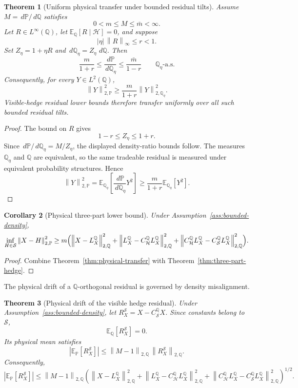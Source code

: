 \documentclass[11pt,a4paper]{amsart}
\theoremstyle{plain}
\newtheorem{theorem}{Theorem}[section]
\newtheorem{corollary}[theorem]{Corollary}
\theoremstyle{definition}
\theoremstyle{remark}
\newcommand{\PP}{\mathbb{P}}
\newcommand{\QQ}{\mathbb{Q}}
\newcommand{\EE}{\mathbb{E}}
\newcommand{\cH}{\mathcal{H}}
\newcommand{\cS}{\mathcal{S}}
\newcommand{\dd}{\,d}
\newcommand{\norm}[1]{\left\lVert #1\right\rVert}
\begin{document}
\begin{theorem}[Uniform physical transfer under bounded residual tilts]\label{thm:uniform-physical-transfer}
Assume \(M=\dd\PP/\dd\QQ\) satisfies
\[
        0<m\le M\le\bar m<\infty.
\]
Let \(R\in L^\infty(\QQ)\), let \(\EE_\QQ[R\mid\cH]=0\), and suppose
\[
        |\eta|\,\norm{R}_\infty\le r<1.
\]
Set \(Z_\eta=1+\eta R\) and \(\dd\QQ_\eta=Z_\eta\,\dd\QQ\).  Then
\[
        \frac{m}{1+r}
        \le
        \frac{\dd\PP}{\dd\QQ_\eta}
        \le
        \frac{\bar m}{1-r}
        \qquad \QQ_\eta\text{-a.s.}
\]
Consequently, for every \(Y\in L^2(\QQ)\),
\[
        \norm{Y}_{2,\PP}^{2}
        \ge
        \frac{m}{1+r}\norm{Y}_{2,\QQ_\eta}^{2}.
\]
Visible-hedge residual lower bounds therefore transfer uniformly over all such bounded residual
tilts.
\end{theorem}

\begin{proof}
The bound on \(R\) gives
\[
        1-r\le Z_\eta\le1+r.
\]
Since \(\dd\PP/\dd\QQ_\eta=M/Z_\eta\), the displayed density-ratio bounds follow.  The measures
\(\QQ_\eta\) and \(\QQ\) are equivalent, so the same tradeable residual is measured under equivalent
probability structures.  Hence
\[
        \norm{Y}_{2,\PP}^{2}
        =
        \EE_{\QQ_\eta}\!\left[\frac{\dd\PP}{\dd\QQ_\eta}Y^2\right]
        \ge
        \frac{m}{1+r}\EE_{\QQ_\eta}[Y^2].
\]
\end{proof}

\begin{corollary}[Physical three-part lower bound]\label{cor:physical-three-part}
Under Assumption~\ref{ass:bounded-density},
\[
        \inf_{H\in\cS}\norm{X-H}_{2,\PP}^2
        \ge
        m\Bigl(
        \norm{X-L_X^\QQ}_{2,\QQ}^2
        +
        \norm{L_X^\QQ-C_{\cH}^{\QQ}L_X^\QQ}_{2,\QQ}^2
        +
        \norm{C_{\cH}^{\QQ}L_X^\QQ-C_{\cS}^{\QQ}L_X^\QQ}_{2,\QQ}^2
        \Bigr).
\]
\end{corollary}

\begin{proof}
Combine Theorem~\ref{thm:physical-transfer} with Theorem~\ref{thm:three-part-hedge}.
\end{proof}

The physical drift of a \(\QQ\)-orthogonal residual is governed by density misalignment.

\begin{theorem}[Physical drift of the visible hedge residual]\label{thm:physical-residual-drift}
Under Assumption~\ref{ass:bounded-density}, let \(R_X^{\cS}=X-C_{\cS}^{\QQ}X\).  Since constants
belong to \(\cS\),
\[
        \EE_\QQ[R_X^{\cS}]=0.
\]
Its physical mean satisfies
\[
        |\EE_\PP[R_X^{\cS}]|
        \le
        \norm{M-1}_{2,\QQ}\,
        \norm{R_X^{\cS}}_{2,\QQ}.
\]
Consequently,
\[
        |\EE_\PP[R_X^{\cS}]|
        \le
        \norm{M-1}_{2,\QQ}
        \left(
        \norm{X-L_X^\QQ}_{2,\QQ}^2
        +
        \norm{L_X^\QQ-C_{\cH}^{\QQ}L_X^\QQ}_{2,\QQ}^2
        +
        \norm{C_{\cH}^{\QQ}L_X^\QQ-C_{\cS}^{\QQ}L_X^\QQ}_{2,\QQ}^2
        \right)^{1/2}.
\]
\end{theorem}
\end{document}
